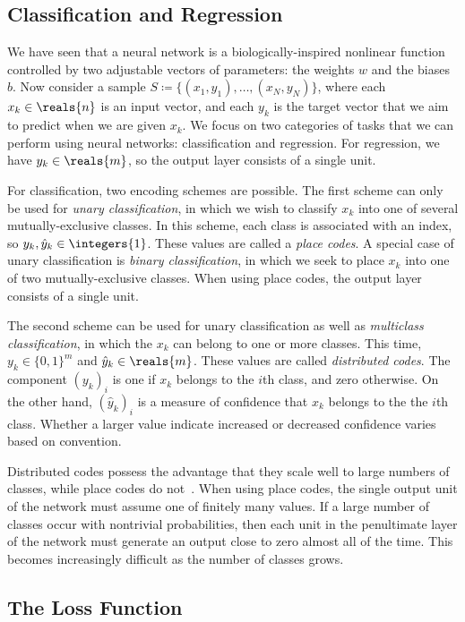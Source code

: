 \documentclass[11pt,a4paper]{article}
\numberwithin{equation}{section}
\begin{document}
\subsection{Classification and Regression}

We have seen that a neural network is a biologically-inspired nonlinear function
controlled by two adjustable vectors of parameters: the weights $w$ and the
biases $b$. Now consider a sample $S \coloneqq \{(x_1, y_1), \ldots, (x_N,
y_N)\}$, where each $x_k \in \reals{n}$ is an input vector, and each $y_k$ is
the target vector that we aim to predict when we are given $x_k$. We focus on
two categories of tasks that we can perform using neural networks:
classification and regression. For regression, we have $y_k \in \reals{m}$, so
the output layer consists of a single unit.

For classification, two encoding schemes are possible. The first scheme can only
be used for \emph{unary classification}, in which we wish to classify $x_k$ into
one of several mutually-exclusive classes. In this scheme, each class is
associated with an index, so $y_k, \hat{y}_k \in \integers{1}$. These values are
called a \emph{place codes}. A special case of unary classification is
\emph{binary classification}, in which we seek to place $x_k$ into one of two
mutually-exclusive classes. When using place codes, the output layer consists of
a single unit.

The second scheme can be used for unary classification as well as
\emph{multiclass classification}, in which the $x_k$ can belong to one or more
classes. This time, $y_k \in \{0, 1\}^m$ and $\hat{y}_k \in \reals{m}$. These
values are called \emph{distributed codes}. The component $(y_k)_i$ is one if
$x_k$ belongs to the $i$th class, and zero otherwise. On the other hand,
$(\hat{y}_k)_i$ is a measure of confidence that $x_k$ belongs to the the $i$th
class. Whether a larger value indicate increased or decreased confidence varies
based on convention.

Distributed codes possess the advantage that they scale well to large
numbers of classes, while place codes do not~\citep{lecun-98b}. When using place
codes, the single output unit of the network must assume one of finitely many
values. If a large number of classes occur with nontrivial probabilities, then
each unit in the penultimate layer of the network must generate an output close
to zero almost all of the time. This becomes increasingly difficult as the
number of classes grows.

\subsection{The Loss Function}
\end{document}
